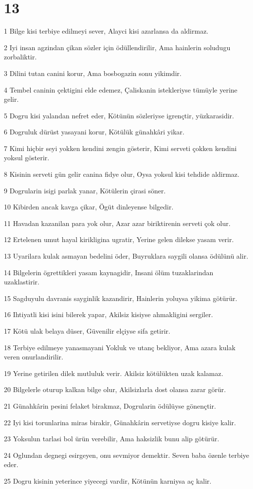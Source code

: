 \chapter{13}

\par 1 Bilge kisi terbiye edilmeyi sever, Alayci kisi azarlansa da aldirmaz.
\par 2 Iyi insan agzindan çikan sözler için ödüllendirilir, Ama hainlerin soludugu zorbaliktir.
\par 3 Dilini tutan canini korur, Ama bosbogazin sonu yikimdir.
\par 4 Tembel caninin çektigini elde edemez, Çaliskanin istekleriyse tümüyle yerine gelir.
\par 5 Dogru kisi yalandan nefret eder, Kötünün sözleriyse igrençtir, yüzkarasidir.
\par 6 Dogruluk dürüst yasayani korur, Kötülük günahkâri yikar.
\par 7 Kimi hiçbir seyi yokken kendini zengin gösterir, Kimi serveti çokken kendini yoksul gösterir.
\par 8 Kisinin serveti gün gelir canina fidye olur, Oysa yoksul kisi tehdide aldirmaz.
\par 9 Dogrularin isigi parlak yanar, Kötülerin çirasi söner.
\par 10 Kibirden ancak kavga çikar, Ögüt dinleyense bilgedir.
\par 11 Havadan kazanilan para yok olur, Azar azar biriktirenin serveti çok olur.
\par 12 Ertelenen umut hayal kirikligina ugratir, Yerine gelen dilekse yasam verir.
\par 13 Uyarilara kulak asmayan bedelini öder, Buyruklara saygili olansa ödülünü alir.
\par 14 Bilgelerin ögrettikleri yasam kaynagidir, Insani ölüm tuzaklarindan uzaklastirir.
\par 15 Sagduyulu davranis sayginlik kazandirir, Hainlerin yoluysa yikima götürür.
\par 16 Ihtiyatli kisi isini bilerek yapar, Akilsiz kisiyse ahmakligini sergiler.
\par 17 Kötü ulak belaya düser, Güvenilir elçiyse sifa getirir.
\par 18 Terbiye edilmeye yanasmayani Yokluk ve utanç bekliyor, Ama azara kulak veren onurlandirilir.
\par 19 Yerine getirilen dilek mutluluk verir. Akilsiz kötülükten uzak kalamaz.
\par 20 Bilgelerle oturup kalkan bilge olur, Akilsizlarla dost olansa zarar görür.
\par 21 Günahkârin pesini felaket birakmaz, Dogrularin ödülüyse gönençtir.
\par 22 Iyi kisi torunlarina miras birakir, Günahkârin servetiyse dogru kisiye kalir.
\par 23 Yoksulun tarlasi bol ürün verebilir, Ama haksizlik bunu alip götürür.
\par 24 Oglundan degnegi esirgeyen, onu sevmiyor demektir. Seven baba özenle terbiye eder.
\par 25 Dogru kisinin yeterince yiyecegi vardir, Kötünün karniysa aç kalir.

